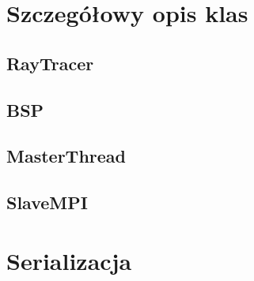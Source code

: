 \section{Szczegółowy opis klas}
	\subsection{RayTracer}
	\subsection{BSP}
	\subsection{MasterThread}
	\subsection{SlaveMPI}
\section{Serializacja}